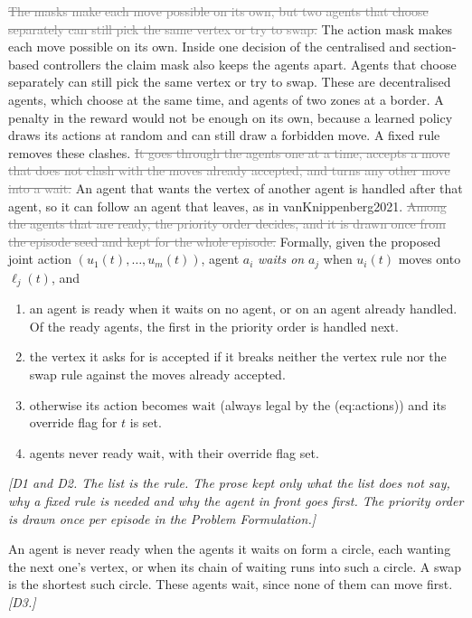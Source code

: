 \documentclass[11pt,a4paper]{article}
\newcommand{\new}[1]{\textcolor{newc}{#1}}
\newcommand{\old}[1]{\textcolor{gray}{\sout{#1}}}
\newcommand{\note}[1]{{\small\itshape [#1]}}
\newcommand{\lab}[1]{\textsf{\footnotesize #1}}
\newcommand{\nref}[1]{the (\lab{#1})}
\newcommand{\citet}[1]{\lab{#1}}
\begin{document}
\old{The masks make each move possible on its own, but two agents that
choose separately can still pick the same vertex or try to swap.}
\new{The action mask makes each move possible on its own. Inside one
decision of the centralised and section-based controllers the claim mask
also keeps the agents apart. Agents that choose separately can still pick the
same vertex or try to swap. These are decentralised agents, which choose at
the same time, and agents of two zones at a border.} A penalty in the reward
would not be enough on its own, because a learned policy draws its actions
at random and can still draw a forbidden move. A fixed rule removes these
clashes. \old{It goes through the agents one at a time, accepts a move that
does not clash with the moves already accepted, and turns any other move into
a wait.} An agent that wants the vertex of another agent is handled after
that agent, so it can follow an agent that leaves, as in
\citet{vanKnippenberg2021}. \old{Among the agents that are ready, the
priority order decides, and it is drawn once from the episode seed and kept
for the whole episode.} Formally, given the proposed joint action
$(u_1(t),\dots,u_m(t))$, agent $a_i$ \emph{waits on} $a_j$ when $u_i(t)$
moves onto $\ell_j(t)$, and
\begin{enumerate}[nosep]
  \item an agent is ready when it waits on no agent, or on an agent already
    handled. Of the ready agents, the first in the priority order is
    handled next.
  \item the vertex it asks for is accepted if it breaks neither the vertex
    rule nor the swap rule against the moves already accepted.
  \item otherwise its action becomes $\mathrm{wait}$ (always legal by
    \nref{eq:actions}) and its override flag for $t$ is set.
  \item agents never ready wait, with their override flag set.
\end{enumerate}
\note{D1 and D2. The list is the rule. The prose kept only what the list does
not say, why a fixed rule is needed and why the agent in front goes first.
The priority order is drawn once per episode in the Problem Formulation.}

An agent is never ready when the agents it waits on form a circle, each
wanting the next one's vertex\new{, or when its chain of waiting runs into
such a circle}. A swap is the shortest such circle. These agents wait, since
none of them can move first. \note{D3.}
\end{document}

